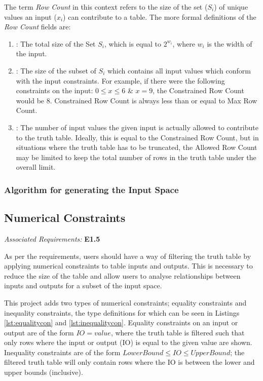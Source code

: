 The term \textit{Row Count} in this context refers to the size of the set ($S_i$) of unique values an input ($x_i$) can contribute to a table. The more formal definitions of the \textit{Row Count} fields are:
\begin{enumerate}
    \item {}: The total size of the Set $S_i$, which is equal to $2^{w_i}$, where $w_i$ is the width of the input.
    \item {}: The size of the subset of $S_i$ which contains all input values which conform with the input constraints. For example, if there were the following constraints on the input: $0 \leq x \leq 6$ \& $x = 9$, the Constrained Row Count would be 8. Constrained Row Count is always less than or equal to Max Row Count.
    \item {}: The number of input values the given input is actually allowed to contribute to the truth table. Ideally, this is equal to the Constrained Row Count, but in situations where the truth table has to be truncated, the Allowed Row Count may be limited to keep the total number of rows in the truth table under the overall limit.
\end{enumerate}

\subsubsection{Algorithm for generating the Input Space}


\subsection{Numerical Constraints}
\emph{Associated Requirements:} \textbf{E1.5}

As per the requirements, users should have a way of filtering the truth table by applying numerical constraints to table inputs and outputs. This is necessary to reduce the size of the table and allow users to analyse relationships between inputs and outputs for a subset of the input space. 

This project adds two types of numerical constraints; equality constraints and inequality constraints, the type definitions for which can be seen in Listings \ref{lst:equalitycon} and \ref{lst:inequalitycon}. Equality constraints on an input or output are of the form $IO = value$, where the truth table is filtered such that only rows where the input or output (IO) is equal to the given value are shown. Inequality constraints are of the form $LowerBound \leq IO \leq UpperBound$; the filtered truth table will only contain rows where the IO is between the lower and upper bounds (inclusive).

